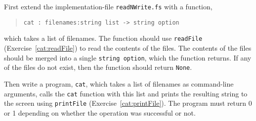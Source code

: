 First extend the implementation-file \lstinline{readNWrite.fs} with a function,
\begin{quote}
  \mbox{\lstinline!cat : filenames:string list -> string option!}
\end{quote}
which takes a list of filenames. The function should use
\lstinline{readFile} (Exercise~\ref{cat:readFile}) to read the
contents of the files. The contents of the files should be merged into
a single \lstinline{string option}, which the function returns. If any of the
files do not exist, then the function should return \lstinline{None}.

Then write a program, \lstinline[language=console]{cat}, which takes a
list of filenames as command-line arguments, calls the \lstinline{cat}
function with this list and prints the resulting string to the screen
using \lstinline{printFile} (Exercise~\ref{cat:printFile}). The
program must return 0 or 1 depending on whether the operation was
successful or not.